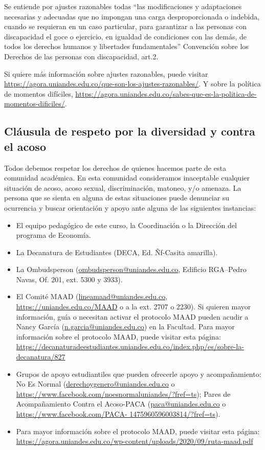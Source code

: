 \documentclass[11pt]{article}
\begin{document}
Se entiende por ajustes razonables todas ``las modificaciones y adaptaciones necesarias y adecuadas que no impongan una carga desproporcionada o indebida, cuando se requieran en un caso particular, para garantizar a las personas con discapacidad el goce o ejercicio, en igualdad de condiciones con las demás, de todos los derechos humanos y libertades fundamentales'' Convención sobre los Derechos de las personas con discapacidad, art.2.

Si quiere más información sobre ajustes razonables, puede visitar \href{esta página de la DECA}{https://agora.uniandes.edu.co/que-son-los-ajustes-razonables/}. Y sobre la política de momentos difíciles, \href{esta otra}{https://agora.uniandes.edu.co/sabes-que-es-la-politica-de-momentos-dificiles/}.


\subsection*{Cláusula de respeto por la diversidad y contra el acoso}

Todos debemos respetar los derechos de quienes hacemos parte de esta comunidad académica. En esta comunidad consideramos inaceptable cualquier situación de acoso, acoso sexual, discriminación, matoneo, y/o amenaza.
La persona que se sienta en alguna de estas situaciones puede denunciar su ocurrencia y buscar orientación y apoyo ante alguna de las siguientes instancias:
\begin{itemize}
\item El equipo pedagógico de este curso, la Coordinación o la Dirección del programa de Economía. 
\item La Decanatura de Estudiantes (DECA, Ed. Ñf-Casita amarilla).
\item La Ombudsperson (\href{mailto:ombudsperson@uniandes.edu.co}{ombudsperson@uniandes.edu.co}, Edificio RGA–Pedro Navas, Of. 201, ext. 5300 y 3933).
\item El Comité MAAD (\href{mailto:lineamaad@uniandes.edu.co}{lineamaad@uniandes.edu.co}, \url{https://uniandes.edu.co/MAAD} o a la ext. 2707 o 2230). Si quieren mayor información, guía o necesitan activar el protocolo MAAD pueden acudir a Nancy García (\href{mailto:n.garcia@uniandes.edu.co}{n.garcia@uniandes.edu.co}) en la Facultad. Para mayor información sobre el protocolo MAAD, puede visitar esta página: \url{https://decanaturadeestudiantes.uniandes.edu.co/index.php/es/sobre-la-decanatura/827}
\item Grupos de apoyo estudiantiles que pueden ofrecerle apoyo y acompañamiento: No Es Normal (\href{mailto:derechoygenero@uniandes.edu.co}{derechoygenero@uniandes.edu.co} o \url{https://www.facebook.com/noesnormaluniandes/?fref=ts}); Pares de Acompañamiento Contra el Acoso-PACA (\href{mailto:paca@uniandes.edu.co}{paca@uniandes.edu.co} o \url{https://www.facebook.com/PACA- 1475960596003814/?fref=ts}).
\item Para mayor información sobre el protocolo MAAD, puede visitar esta página: \url{https://agora.uniandes.edu.co/wp-content/uploads/2020/09/ruta-maad.pdf}


\end{itemize}
\end{document}
